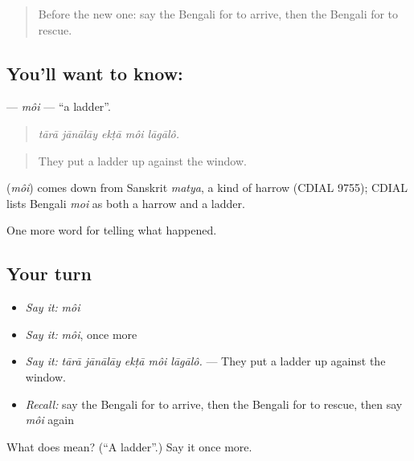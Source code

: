 \label{lesson:BN-C280-moi}



\begin{quote}
Before the new one: say the Bengali for to arrive, then the Bengali for to rescue.
\end{quote}

\subsection*{You'll want to know: }
\textbf{} — \emph{môi} — \textquotedblleft{}a ladder\textquotedblright{}.

\begin{quote}
    
\end{quote}

\begin{quote}
\emph{tārā jānālāy ekṭā môi lāgālô.}
\end{quote}

\begin{quote}
They put a ladder up against the window.
\end{quote}

\begin{cousinweb}
\textbf{} (\emph{môi}) comes down from Sanskrit \emph{matya}, a kind of harrow (CDIAL 9755); CDIAL lists Bengali \emph{moi} as both a harrow and a ladder.
\end{cousinweb}

\begin{grammarlens}[title={What you've built}]
One more word for telling what happened.
\end{grammarlens}

\subsection*{Your turn}
\begin{itemize}
\raggedright
  \item \emph{Say it:} \emph{môi}
  \item \emph{Say it:} \emph{môi}, once more
  \item \emph{Say it:} \emph{tārā jānālāy ekṭā môi lāgālô.} — They put a ladder up against the window.
  \item \emph{Recall:} say the Bengali for to arrive, then the Bengali for to rescue, then say \emph{môi} again
\end{itemize}

\begin{tcolorbox}[breakable,colback=teal!4,colframe=teal!35!black,title={Before you move on}]
What does  mean? (\textquotedblleft{}A ladder\textquotedblright{}.) Say it once more.
\end{tcolorbox}
